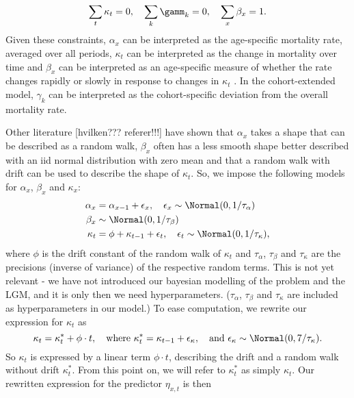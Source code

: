 \begin{equation}
    \sum_t\kappa_t = 0,\quad \sum_k\gamm_k = 0, \quad \sum_x\beta_x = 1.
    \label{eq:LC-constraints}    
\end{equation}
Given these constraints, $\alpha_x$ can be interpreted as the age-specific mortality rate, averaged over all periods, $\kappa_t$ can be interpreted as the change in mortality over time and $\beta_x$ can be interpreted as an age-specific measure of whether the rate changes rapidly or slowly in response to changes in $\kappa_t$ \cite{LeeCarter1992}. In the cohort-extended model, $\gamma_k$ can be interpreted as the cohort-specific deviation from the overall mortality rate.




Other literature [hvilken??? referer!!!] have shown that $\alpha_x$ takes a shape that can be described as a random walk, $\beta_x$ often has a less smooth shape better described with an iid normal distribution with zero mean and that a random walk with drift can be used to describe the shape of $\kappa_t$. So, we impose the following models for $\alpha_x$, $\beta_x$ and $\kappa_x$:
\begin{equation}
    \begin{aligned}
    \alpha_x &= \alpha_{x-1} + \epsilon_{x}, \quad \epsilon_x \sim \Normal(0,1/\tau_{\alpha}) \\
    \beta_x &\sim \Normal(0, 1/\tau_{\beta}) \\
    \kappa_t &= \phi + \kappa_{t-1} + \epsilon_t, \quad \epsilon_t\sim \Normal(0, 1/\tau_\kappa),
    \end{aligned}
    \label{eq:LCrandomEffects}
\end{equation}
where $\phi$ is the drift constant of the random walk of $\kappa_t$ and $\tau_\alpha$, $\tau_\beta$ and $\tau_\kappa$ are the precisions (inverse of variance) of the respective random terms.
\textcolor{myDarkGreen}{This is not yet relevant - we have not introduced our bayesian modelling of the problem and the LGM, and it is only then we need hyperparameters. }
($\tau_\alpha$, $\tau_\beta$ and $\tau_\kappa$ are included as hyperparameters in our model.)
To ease computation, we rewrite our expression for $\kappa_t$ as
\begin{equation}
    \kappa_t = \kappa_{t}^* + \phi\cdot t, \quad \text{where } \kappa_t^*=\kappa_{t-1} + \epsilon_\kappa, \quad\text{and }\epsilon_\kappa\sim\Normal(0, 7/\tau_\kappa).
    \label{eq:DriftlessKappa}
\end{equation}
So $\kappa_t$ is expressed by a linear term $\phi \cdot t$, describing the drift and a random walk without drift $\kappa_t^*$. From this point on, we will refer to $\kappa_t^*$ as simply $\kappa_t$. Our rewritten expression for the predictor $\eta_{x,t}$ is then
